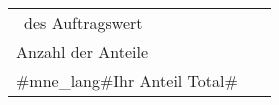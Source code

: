    \fi%
\else
  \Bwithvat%
    \def\mnef{\hfill\begin{tabular}{p{0.8\textwidth}l}
              \variable[-1]{Brescount} \Bproductunit\ des Auftragswert & \bf\Bfullnetprice\ \variable[]{Bcurrency} \\
               Anzahl der Anteile & \bf\Binvoicecount \\
               \hline
               \bf\variable[Netto]{Hnetprice} & \bf\variable[]{Bnetprice} \variable[]{Bcurrency} \\%
               \bf\variable[MWST]{Hresabsvat} & \bf\variable[]{Bresabsvat} \variable[]{Bcurrency} \\%
               \bf\variable[Brutto]{Hgrossprice} & \bf\variable[]{Bgrossprice}  \variable[]{Bcurrency} \\%
    \end{tabular}\newline
  }%
  \else
    \def\mnef{\hfill\begin{tabular}{p{0.8\textwidth}l}
              \variable[-1]{Brescount} \Bproductunit\ des Auftragswert & \bf\Bfullnetprice\ \variable[]{Bcurrency} \\
               Anzahl der Anteile & \bf\Binvoicecount \\
               \hline
               #mne_lang#Ihr Anteil Total# & \bf\variable[]{Bgrossprice}  \variable[]{Bcurrency} \\%
              \end{tabular}\newline\newline\newline
   }%
  \fi
\fi
{}\Bsortcol\mnef\fi%
\fi